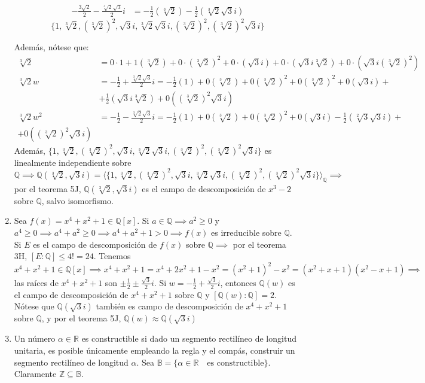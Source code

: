 \begin{ejemplo}
\begin{enumerate}
\begin{cajita}
\begin{align*}
                -\frac{3\sqrt{2}}{2}-\frac{\sqrt[3]{2}\sqrt{3}}{2}i &= -\frac{1}{2}(\sqrt[3]{2})-\frac{1}{2}(\sqrt[3]{2}\sqrt{3}i)
            \end{align*}
            $$\{1,\sqrt[3]{2},(\sqrt[3]{2})^2,\sqrt{3}i, \sqrt[3]{2}\sqrt{3}i, (\sqrt[3]{2})^2,(\sqrt[3]{2})^2\sqrt{3}i\}$$
        \end{cajita}
        Además, nótese que: 
        \begin{align*}
            \sqrt[3]{2} &=0\cdot 1 +1(\sqrt[3]{2})+0\cdot (\sqrt[3]{2})^2+0\cdot(\sqrt{3}i)+0\cdot(\sqrt{3}i\sqrt[3]{2})+0\cdot (\sqrt{3}i(\sqrt[3]{2})^2)\\
            \sqrt[3]{2}w &= -\frac{1}{2}+\frac{\sqrt[3]{2}\sqrt{3}}{2} i = -\frac{1}{2}(1)+0(\sqrt[3]{2})+0(\sqrt[3]{2})^2+0(\sqrt[3]{2})^2+0(\sqrt{3}i)+\\
            &+\frac{1}{2}(\sqrt{3}i\sqrt[3]{2})+0((\sqrt[3]{2})^2\sqrt{3}i)\\
            \sqrt[3]{2}w^2&=-\frac{1}{2}-\frac{\sqrt[3]{2}\sqrt{3}}{2}i = -\frac{1}{2}(1)+0(\sqrt[3]{2})+0(\sqrt[3]{2})^2+0(\sqrt{3}i)-\frac{1}{2}(\sqrt[2]{3}\sqrt{3}i)+\\
            +0((\sqrt[3]{2})^2\sqrt{3}i)
        \end{align*}
        Además, $\{1,\sqrt[3]{2},(\sqrt[3]{2})^2,\sqrt{3}i, \sqrt[3]{2}\sqrt{3}i, (\sqrt[3]{2})^2,(\sqrt[3]{2})^2\sqrt{3}i\}$ es linealmente independiente sobre $\mathbb{Q}\implies \mathbb{Q}(\sqrt[3]{2},\sqrt{3}i)=\langle \{1,\sqrt[3]{2},(\sqrt[3]{2})^2,\sqrt{3}i, \sqrt[3]{2}\sqrt{3}i, (\sqrt[3]{2})^2,(\sqrt[3]{2})^2\sqrt{3}i\}\rangle_\mathbb{Q}\implies$ por el teorema 5J, $\mathbb{Q}(\sqrt[3]{2},\sqrt{3}i)$ es el campo de descomposición de $x^3-2$ sobre $\mathbb{Q}$, salvo isomorfismo. 
        \item Sea $f(x)=x^4+x^2+1\in \mathbb{Q}[x]$. Si $a\in \mathbb{Q}\implies a^2\geq 0$ y $a^4\geq 0\implies a^4+a^2\geq 0\implies a^4+a^2+1>0\implies f(x)$ es irreducible sobre $\mathbb{Q}$. Si $E$ es el campo de descomposición de $f(x)$ sobre $\mathbb{Q}\implies$ por el teorema 3H, $[E:\mathbb{Q}]\leq 4!=24$. Tenemos $x^4+x^2+1\in \mathbb{Q}[x]\implies x^4+x^2+1 = x^4+2x^2+1-x^2=(x^2+1)^2-x^2 = (x^2+x+1)(x^2-x+1)\implies$ las raíces de $x^4+x^2+1$ son $\pm \frac{1}{2}\pm\frac{\sqrt{3}}{2}i$. Si $w=-\frac{1}{2}+\frac{\sqrt{3}}{2}i$, entonces $\mathbb{Q}(w)$ es el campo de descomposición de $x^4+x^2+1$ sobre $\mathbb{Q}$ y $[\mathbb{Q}(w):\mathbb{Q}]=2$. Nótese que $\mathbb{Q}(\sqrt{3}i)$ también es campo de descomposición de $x^4+x^2+1$ sobre $\mathbb{Q}$, y por el teorema 5J, $\mathbb{Q}(w)\approx \mathbb{Q}(\sqrt{3}i)$
        \item Un número $\alpha\in \mathbb{R}$ es constructible si dado un segmento rectilíneo de longitud unitaria, es posible únicamente empleando la regla y el compás, construir un segmento rectilíneo de longitud $\alpha$.\bigbreak 
        Sea $\mathbb{B}=\{\alpha\in\mathbb{R}\quad \text{es constructible}\}$. Claramente $\mathbb{Z}\subseteq \mathbb{B}$.
        \end{enumerate}
\end{ejemplo}

